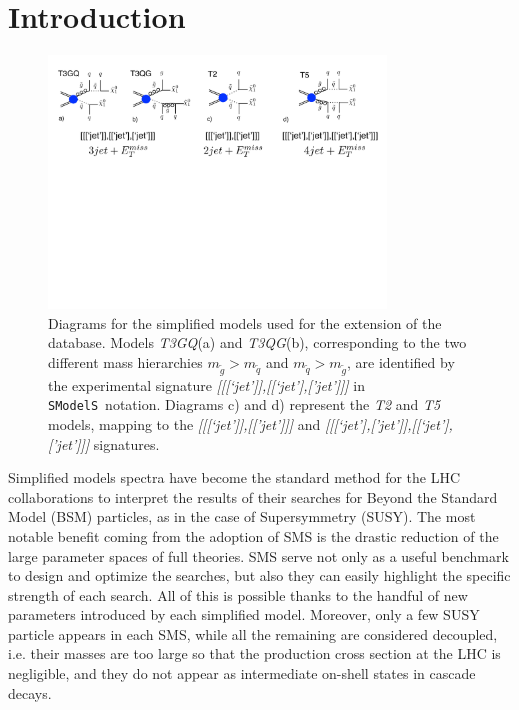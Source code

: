 \documentclass[preprint,number,sort&compress,twocolumn,3p]{elsstyarticle}
\newcommand{\SMO}{\texttt{SModelS\xspace}}
\begin{document}
\section{Introduction}
\begin{figure}
	\begin{center}
		\includegraphics[width=0.8\textwidth]{PLOTS/Diagrams_2}
	\end{center}
	\caption{Diagrams for the simplified models used for the extension of the database. Models \textit{T3GQ}(a) and \textit{T3QG}(b), corresponding to the two different mass hierarchies $m_{\tilde g} > m_{\tilde q}$ and $m_{\tilde q} > m_{\tilde g}$, are identified by the experimental signature \textit{[[[`jet']],[[`jet'],['jet']]]} in \SMO~notation. Diagrams c) and d) represent the \textit{T2} and \textit{T5} models, mapping to the \textit{[[[`jet']],[['jet']]]} and \textit{[[[`jet'],['jet']],[[`jet'],['jet']]]} signatures.}
	\label{Diagrams}
\end{figure}
Simplified models spectra have become the standard method for the LHC collaborations to interpret the results of their searches for Beyond the Standard Model (BSM) particles, as in the case of Supersymmetry (SUSY). The most notable benefit coming from the adoption of SMS is the drastic reduction of the large parameter spaces of full theories. SMS serve not only as a useful benchmark to design and optimize the searches, but also they can easily highlight the specific strength of each search. All of this is possible thanks to the handful of new parameters introduced by each simplified model. Moreover, only a few SUSY particle appears in each SMS, while all the remaining are considered decoupled, i.e. their masses are too large so that the production cross section at the LHC is negligible, and they do not appear as intermediate on-shell states in cascade decays. 
\end{document}
